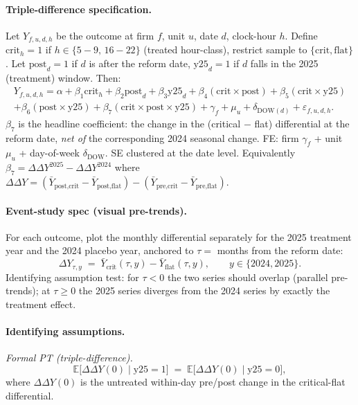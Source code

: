 \documentclass[11pt,a4paper]{article}
\begin{document}
\paragraph{Triple-difference specification.}
Let $Y_{f,u,d,h}$ be the outcome at firm $f$, unit $u$, date $d$, clock-hour $h$. Define $\text{crit}_h = 1$ if $h \in \{5\!-\!9,\,16\!-\!22\}$ (treated hour-class), restrict sample to $\{\text{crit}, \text{flat}\}$. Let $\text{post}_d = 1$ if $d$ is after the reform date, $\text{y25}_d = 1$ if $d$ falls in the 2025 (treatment) window. Then:
\begin{multline}
  Y_{f,u,d,h} = \alpha + \beta_1 \text{crit}_h + \beta_2 \text{post}_d + \beta_3 \text{y25}_d
    + \beta_4 (\text{crit} \times \text{post}) + \beta_5 (\text{crit} \times \text{y25}) \\
    + \beta_6 (\text{post} \times \text{y25})
    + \boxed{\beta_7 (\text{crit} \times \text{post} \times \text{y25})}
    + \gamma_f + \mu_u + \delta_{\text{DOW}(d)} + \varepsilon_{f,u,d,h}.
\end{multline}
$\beta_7$ is the headline coefficient: the change in the (critical $-$ flat) differential at the reform date, \emph{net of} the corresponding 2024 seasonal change. FE: firm $\gamma_f$ + unit $\mu_u$ + day-of-week $\delta_{\text{DOW}}$. SE clustered at the date level. Equivalently $\beta_7 = \Delta\Delta Y^{2025} - \Delta\Delta Y^{2024}$ where $\Delta\Delta Y = (\bar Y_{\text{post,crit}} - \bar Y_{\text{post,flat}}) - (\bar Y_{\text{pre,crit}} - \bar Y_{\text{pre,flat}})$.

\paragraph{Event-study spec (visual pre-trends).} For each outcome, plot the monthly differential separately for the 2025 treatment year and the 2024 placebo year, anchored to $\tau =$ months from the reform date:
\[
  \Delta Y_{\tau,y} \;=\; \bar Y_{\text{crit}}(\tau, y) - \bar Y_{\text{flat}}(\tau, y), \qquad y \in \{2024, 2025\}.
\]
Identifying assumption test: for $\tau < 0$ the two series should overlap (parallel pre-trends); at $\tau \ge 0$ the 2025 series diverges from the 2024 series by exactly the treatment effect.

\paragraph{Identifying assumptions.}
\textit{Formal PT (triple-difference).}
\[
  \mathbb{E}\big[\Delta\Delta Y(0) \mid \text{y25}=1\big] \;=\; \mathbb{E}\big[\Delta\Delta Y(0) \mid \text{y25}=0\big],
\]
where $\Delta\Delta Y(0)$ is the untreated within-day pre/post change in the critical-flat differential.
\end{document}
